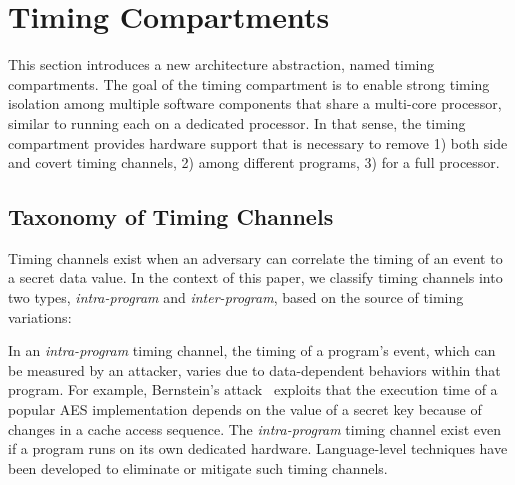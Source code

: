 \section{Timing Compartments}

This section introduces a new architecture abstraction, named timing 
compartments.
The goal of the timing compartment is to enable strong timing isolation
among multiple software components that share a multi-core processor,
similar to running each on a dedicated processor.
In that sense, the timing compartment provides hardware support that is 
necessary to remove 1) both side and covert timing channels, 2) among
different programs, 3) for a full processor.


\subsection{Taxonomy of Timing Channels}


Timing channels exist when an adversary can correlate the timing of an event
to a secret data value. In the context of this paper, we classify timing channels
into two types, 
{\em intra-program} and {\em inter-program}, 
based on the source of timing variations:

In an {\em intra-program} timing channel, the timing of a program's event,
which can be measured by an attacker, varies
due to data-dependent behaviors within that program.
For example, Bernstein's attack~\cite{bernstein} exploits that the execution
time of a popular AES implementation depends on the value of a secret key because 
of changes in a cache access sequence.
The {\em intra-program} timing channel exist even if a program runs on its
own dedicated hardware.
Language-level techniques have been developed to
eliminate \cite{timesens} or mitigate \cite{mitigation1,mitigation2,mitigation3} 
such timing channels.

